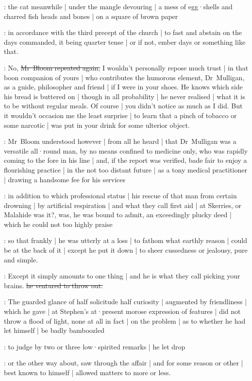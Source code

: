 :
the cat meanwhile |
under the mangle devouring |
a mess of egg·shells and charred fish heads and bones |
on a square of brown paper

:
in accordance with the third precept of the church |
to fast and abstain on the days commanded,
it being quarter tense |
or if not,
ember days or something like that.

\Bloom:
No,
\sout{Mr~Bloom repeated again,}
I wouldn't personally repose much trust |
in that boon companion of yours |
who contributes the humorous element,
Dr~Mulligan,
as a guide,
philosopher and friend |
if I were in your shoes.
He knows which side his bread is buttered on |
though in all probability |
he never realised |
what it is to be without regular meals.
Of course |
you didn't notice as much as I did.
But it wouldn't occasion me the least surprise |
to learn that a pinch of tobacco or some narcotic |
was put in your drink for some ulterior object.

:
Mr~Bloom understood however |
from all he heard |
that Dr~Mulligan was a versatile all·round man,
by no means confined to medicine only,
who was rapidly coming to the fore in his line |
and,
if the report was verified,
bade fair to enjoy a flourishing practice |
in the not too distant future |
as a tony medical practitioner |
drawing a handsome fee for his services

:
in addition to which professional status |
his rescue of that man from certain drowning |
by artificial respiration |
and what they call first aid |
at Skerries,
or Malahide was it?,
was,
he was bound to admit,
an exceedingly plucky deed |
which he could not too highly praise

:
so that frankly |
he was utterly at a loss |
to fathom what earthly reason |
could be at the back of it |
except he put it down |
to sheer cussedness or jealousy,
pure and simple.

\Bloom:
Except it simply amounts to one thing |
and he is what they call picking your brains.
\sout{he ventured to throw out.}

:
The guarded glance of half solicitude half curiosity |
augmented by friendliness |
which he gave |
at Stephen's at·present morose expression of features |
did not throw a flood of light,
none at all in fact |
on the problem |
as to whether he had let himself |
be badly bamboozled

:
to judge by two or three low·spirited remarks |
he let drop

:
or the other way about,
saw through the affair |
and for some reason or other |
best known to himself |
allowed matters to more or less.

